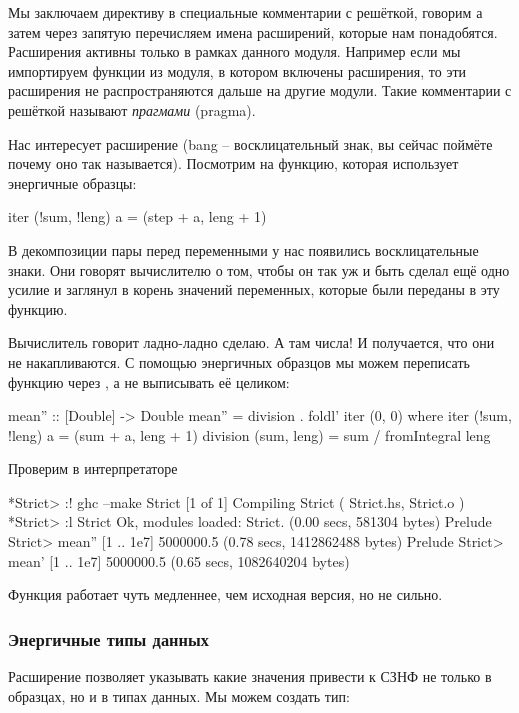 Мы заключаем директиву в специальные комментарии с решёткой,
говорим  а затем через запятую перечисляем
имена расширений, которые нам понадобятся. Расширения активны 
только в рамках данного модуля. Например если мы импортируем
функции из модуля, в котором включены расширения, то эти
расширения не распространяются дальше на другие модули. 
Такие комментарии с решёткой называют \emph{прагмами} (pragma).

Нас интересует расширение  (bang -- восклицательный
знак, вы сейчас поймёте почему оно так называется). 
Посмотрим на функцию, которая использует энергичные образцы:

\begin{code}
iter (!sum, !leng) a = (step + a, leng + 1)
\end{code}

В декомпозиции пары перед переменными у нас появились 
восклицательные знаки. Они говорят вычислителю о том, 
чтобы он так уж и быть сделал ещё одно усилие и заглянул в корень
значений переменных, которые были переданы в эту функцию. 

Вычислитель говорит ладно-ладно сделаю. А там числа! И
получается, что они не накапливаются. С помощью
энергичных образцов мы можем переписать функцию  
через , а не выписывать её целиком:

\begin{code}
mean'' :: [Double] -> Double
mean'' = division . foldl' iter (0, 0)
    where iter (!sum, !leng) a = (sum  + a, leng + 1)
          division (sum, leng) = sum / fromIntegral leng
\end{code}

Проверим в интерпретаторе

\begin{code}
*Strict> :! ghc --make Strict
[1 of 1] Compiling Strict           ( Strict.hs, Strict.o )
*Strict> :l Strict
Ok, modules loaded: Strict.
(0.00 secs, 581304 bytes)
Prelude Strict> mean'' [1 .. 1e7]
5000000.5
(0.78 secs, 1412862488 bytes)
Prelude Strict> mean' [1 .. 1e7]
5000000.5
(0.65 secs, 1082640204 bytes)
\end{code}

Функция работает чуть медленнее, чем исходная версия, но не
сильно.

\subsubsection{Энергичные типы данных}

Расширение  позволяет указывать какие
значения привести к СЗНФ не только в образцах, но и в 
типах данных. Мы можем создать тип:


